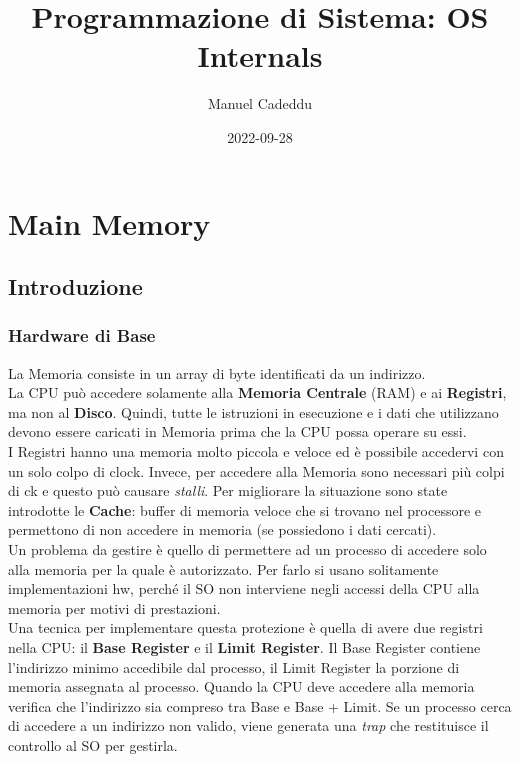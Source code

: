 \documentclass{article}
\title{Programmazione di Sistema: OS Internals}
\date{2022-09-28}
\author{Manuel Cadeddu}
\begin{document}
	\setcounter{tocdepth}{4}
	\setcounter{secnumdepth}{4}
	\maketitle
	\newpage
	\doublespacing
	\tableofcontents
	\singlespacing
	\newpage
	
	\section{Main Memory}

		\subsection{Introduzione}

			\subsubsection{Hardware di Base}
				La Memoria consiste in un array di byte identificati da un indirizzo.
				\\La CPU può accedere solamente alla \textbf{Memoria Centrale} (RAM) e ai \textbf{Registri}, ma non al \textbf{Disco}. Quindi, tutte le istruzioni in esecuzione e i dati che utilizzano devono essere caricati in Memoria prima che la CPU possa operare su essi.
				\\I Registri hanno una memoria molto piccola e veloce ed è possibile accedervi con un solo colpo di clock. Invece, per accedere alla Memoria sono necessari più colpi di ck e questo può causare \textit{stalli}. Per migliorare la situazione sono state introdotte le \textbf{Cache}: buffer di memoria veloce che si trovano nel processore e permettono di non accedere in memoria (se possiedono i dati cercati).
				\\Un problema da gestire è quello di permettere ad un processo di accedere solo alla memoria per la quale è autorizzato. Per farlo si usano solitamente implementazioni hw, perché il SO non interviene negli accessi della CPU alla memoria per motivi di prestazioni.
				\\Una tecnica per implementare questa protezione è quella di avere due registri nella CPU: il \textbf{Base Register} e il \textbf{Limit Register}. Il Base Register contiene l'indirizzo minimo accedibile dal processo, il Limit Register la porzione di memoria assegnata al processo. Quando la CPU deve accedere alla memoria verifica che l'indirizzo sia compreso tra Base e Base + Limit. Se un processo cerca di accedere a un indirizzo non valido, viene generata una \textit{trap} che restituisce il controllo al SO per gestirla.
\end{document}
